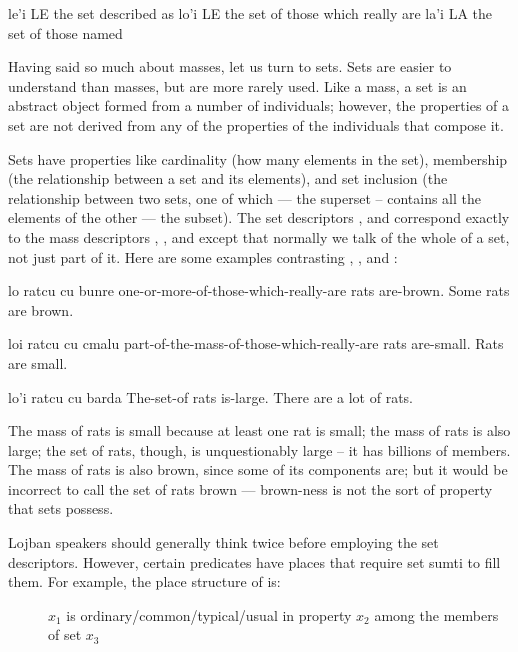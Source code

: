    le'i    LE  the set described as
    lo'i    LE  the set of those which really are
    la'i    LA  the set of those named

Having said so much about masses, let us turn to sets. Sets are
    easier to understand than masses, but are more rarely used.
    Like a mass, a set is an abstract object formed from a number
    of individuals; however, the properties of a set are not
    derived from any of the properties of the individuals that
    compose it. 

Sets have properties like cardinality (how many elements in
    the set), membership (the relationship between a set and its
    elements), and set inclusion (the relationship between two
    sets, one of which --- the superset -- contains all the
    elements of the other --- the subset). The set descriptors
    ,  and  correspond exactly to the mass
    descriptors , , and  except that normally
    we talk of the whole of a set, not just part of it. Here are
    some examples contrasting , , and :
\begin{example}
lo ratcu cu bunre\n
one-or-more-of-those-which-really-are rats are-brown.\n
Some rats are brown.
\end{example}

\begin{example}
loi ratcu\n
\T	cu cmalu\n
part-of-the-mass-of-those-which-really-are rats\n
\T	are-small.\n
Rats are small.
\end{example}

\begin{example}
lo'i ratcu cu barda\n
The-set-of rats is-large.\n
There are a lot of rats.
\end{example}

The mass of rats is small because at least one rat is small;
    the mass of rats is also large; the set of rats, though, is
    unquestionably large -- it has billions of members. The mass of
    rats is also brown, since some of its components are; but it
    would be incorrect to call the set of rats brown --- brown-ness
    is not the sort of property that sets possess.

Lojban speakers should generally think twice before
    employing the set descriptors. However, certain predicates have
    places that require set sumti to fill them. For example, the
    place structure of  is:
\begin{description}
\item[] $x_1$ is ordinary/common/typical/usual in property $x_2$ among the members of set $x_3$

\end{description}

